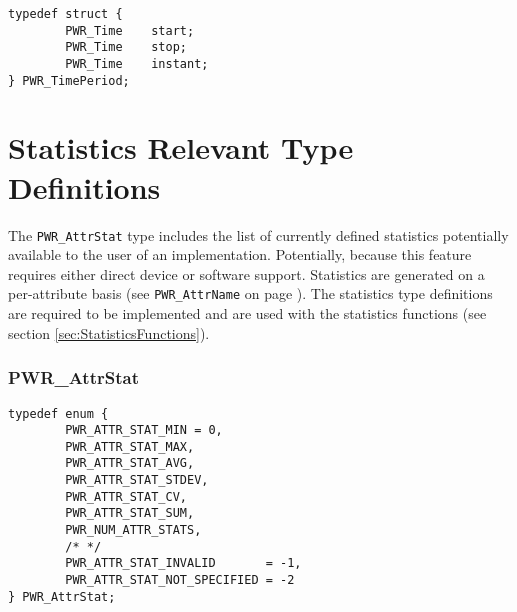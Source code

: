 \begin{center}
\begin{minipage}{.95\linewidth}%
\begin{lstlisting}
typedef struct {
        PWR_Time    start;
        PWR_Time    stop;
        PWR_Time    instant;
} PWR_TimePeriod;
\end{lstlisting}
\end{minipage}
\end{center}

\section{Statistics Relevant Type Definitions}\label{sec:StatisticTypeDefinitions}
The \texttt{PWR_AttrStat} type includes the list of currently defined statistics potentially available to the user of an implementation.
Potentially, because this feature requires either direct device or software support.
Statistics are generated on a per-attribute basis (see \texttt{PWR_AttrName} on page \pageref{type:AttrName}). 
The statistics type definitions are required to be implemented and are used with the statistics functions (see section \ref{sec:StatisticsFunctions}).


\subsubsection{PWR_AttrStat}\label{type:AttrStat}

\begin{center}
\begin{minipage}{.95\linewidth}%
\begin{lstlisting}
typedef enum {
        PWR_ATTR_STAT_MIN = 0,
        PWR_ATTR_STAT_MAX,
        PWR_ATTR_STAT_AVG,
        PWR_ATTR_STAT_STDEV,
        PWR_ATTR_STAT_CV,
        PWR_ATTR_STAT_SUM,
        PWR_NUM_ATTR_STATS,
        /* */
        PWR_ATTR_STAT_INVALID       = -1,
        PWR_ATTR_STAT_NOT_SPECIFIED = -2
} PWR_AttrStat;
\end{lstlisting}
\end{minipage}
\end{center}

